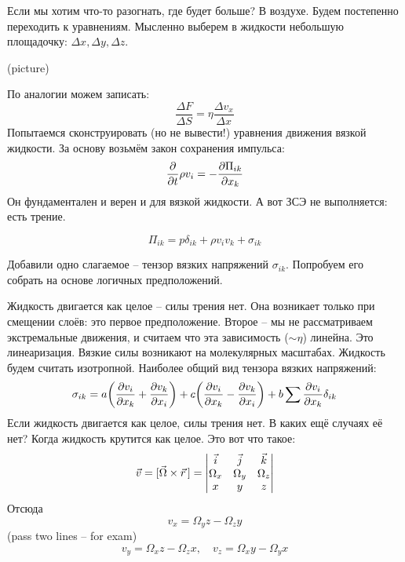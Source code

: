 Если мы хотим что-то разогнать, где будет больше? В воздухе.
Будем постепенно переходить к уравнениям. Мысленно выберем в жидкости небольшую площадочку: $\Delta x, \Delta y, \Delta z$.

(picture)

По аналогии можем записать:
\begin{equation}
    \frac{\Delta F}{\Delta S} = \eta \frac{\Delta v_x}{\Delta x}
\end{equation}
Попытаемся сконструировать (но не вывести!) уравнения движения вязкой жидкости.
За основу возьмём закон сохранения импульса:
\begin{equation}
    \pdv{t}\rho v_i = -\pdv{\Pi_{ik}}{x_k}
\end{equation}
Он фундаментален и верен и для вязкой жидкости. А вот ЗСЭ не выполняется: есть трение.

\begin{equation}
    \Pi_{ik} = p \delta_{ik}+\rho v_i v_k+\sigma_{ik}
\end{equation}

Добавили одно слагаемое -- тензор вязких напряжений $\sigma_{ik}$. 
Попробуем его собрать на основе логичных предположений.

Жидкость двигается как целое -- силы трения нет. Она возникает только при смещении слоёв: это первое предположение.
Второе -- мы не рассматриваем экстремальные движения, и считаем что эта зависимость ($\sim \eta$) линейна.
Это линеаризация. Вязкие силы возникают на молекулярных масштабах.
Жидкость будем считать изотропной. Наиболее общий вид тензора вязких напряжений:
\begin{equation}
    \sigma_{ik} = a\qty(
        \pdv{v_i}{x_k}+\pdv{v_k}{x_i}
    )+
    c\qty(
       \pdv{v_i}{x_k}-\pdv{v_k}{x_i}
    )+
    b\sum \pdv{v_i}{x_k} \delta_{ik}
\end{equation}
Если жидкость двигается как целое, силы трения нет. В каких ещё случаях её нет?
Когда жидкость крутится как целое. Это вот что такое:
\begin{equation}
    \vec{v} = [\vec{\Omega}\times \vec{r}\,]  =
    \mqty|
    \vec{i} & \vec{j} & \vec{k}\\
    \Omega_x & \Omega_y & \Omega_z\\
    x& y & z
    |
\end{equation}
Отсюда
\begin{equation}
    v_x = \Omega_y z - \Omega_z y
\end{equation}
(pass two lines -- for exam)
\begin{equation}
    v_y = \Omega_x z - \Omega_z x, \quad v_z = \Omega_x y - \Omega_y x
\end{equation}

